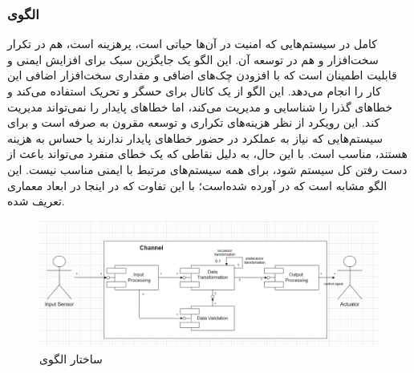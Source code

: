 \subsubsection{الگوی }
\label{archSafeProtectSingleChSec}
\begin{RTL}
 کامل در سیستم‌هایی که امنیت در آن‌ها حیاتی است،
پرهزینه است، هم در تکرار سخت‌افزار و هم در توسعه آن.
این الگو \cite{ref4}
یک جایگزین سبک برای افزایش ایمنی و قابلیت اطمینان است که با افزودن
چک‌های اضافی و مقداری سخت‌افزار اضافی این کار را انجام می‌دهد.
این الگو از یک کانال برای حسگر و تحریک استفاده می‌کند و خطاهای گذرا را
شناسایی و مدیریت می‌کند، اما خطاهای پایدار را نمی‌تواند مدیریت کند.
این رویکرد از نظر هزینه‌های تکراری و توسعه مقرون به صرفه است و برای سیستم‌هایی
که نیاز به عملکرد در حضور خطاهای پایدار ندارند یا حساس به هزینه هستند،
مناسب است. با این حال، به دلیل نقاطی که یک خطای منفرد می‌تواند باعث
از دست رفتن کل سیستم شود، برای همه سیستم‌های مرتبط با ایمنی مناسب نیست.
این الگو مشابه  است که
در \cite{ref1} آورده شده‌است؛ با این تفاوت که در اینجا در ابعاد معماری
تعریف شده.
\end{RTL}
\begin{figure}[h!]
\centering
\includegraphics[scale=0.5]{images/second/protectedSingle.png}
\caption{ساختار الگوی }
\end{figure}